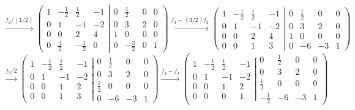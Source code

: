 \documentclass[a4paper,12pt]{article}
\begin{document}
$$
\xrightarrow[]{f_2/(1/2)}
\left ( \left.\begin{matrix}
    1 & -\frac{1}{2} & \frac{1}{2} & -1 \\ 
    0 & 1 & -1 & -2 \\
    0 & 0 & 2 & 4 \\ 
    0 & \frac{3}{2} & -\frac{1}{2} & 0
    \end{matrix}\right| \begin{matrix}
    0 & \frac{1}{2} & 0 & 0 \\ 
    0 & 3 & 2 & 0 \\
    1 & 0 & 0 & 0 \\ 
    0 & -\frac{3}{2} & 0 & 1
    \end{matrix}\right )
\xrightarrow[]{f_4-(3/2)f_2}
\left ( \left.\begin{matrix}
    1 & -\frac{1}{2} & \frac{1}{2} & -1 \\ 
    0 & 1 & -1 & -2 \\
    0 & 0 & 2 & 4 \\ 
    0 & 0 & 1 & 3
    \end{matrix}\right| \begin{matrix}
    0 & \frac{1}{2} & 0 & 0 \\ 
    0 & 3 & 2 & 0 \\
    1 & 0 & 0 & 0 \\ 
    0 & -6 & -3 & 1
    \end{matrix}\right )
$$
$$
\xrightarrow[]{f_3/2}
\left ( \left.\begin{matrix}
    1 & -\frac{1}{2} & \frac{1}{2} & -1 \\ 
    0 & 1 & -1 & -2 \\
    0 & 0 & 1 & 2 \\ 
    0 & 0 & 1 & 3
    \end{matrix}\right| \begin{matrix}
    0 & \frac{1}{2} & 0 & 0 \\ 
    0 & 3 & 2 & 0 \\
    \frac{1}{2} & 0 & 0 & 0 \\ 
    0 & -6 & -3 & 1
    \end{matrix}\right )
\xrightarrow[]{f_4-f_3}
\left ( \left.\begin{matrix}
    1 & -\frac{1}{2} & \frac{1}{2} & -1 \\ 
    0 & 1 & -1 & -2 \\
    0 & 0 & 1 & 2 \\ 
    0 & 0 & 0 & 1
    \end{matrix}\right| \begin{matrix}
    0 & \frac{1}{2} & 0 & 0 \\ 
    0 & 3 & 2 & 0 \\
    \frac{1}{2} & 0 & 0 & 0 \\ 
    -\frac{1}{2} & -6 & -3 & 1
    \end{matrix}\right )
$$
\end{document}
